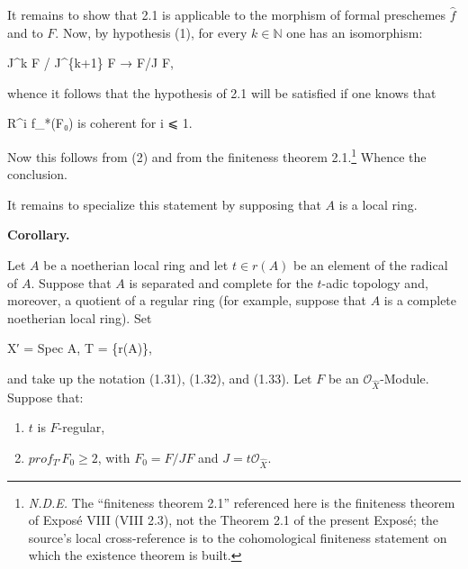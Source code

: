 \documentclass[
]{article}
\newenvironment{Shaded}{}{}
\newcommand{\NormalTok}[1]{#1}
\begin{document}
It remains to show that 2.1 is applicable to the morphism of formal
preschemes \(\hat{f}\) and to \(F\). Now, by hypothesis (1), for every
\(k \in \mathbb{N}\) one has an isomorphism:

\begin{Shaded}
\begin{Highlighting}[]
\NormalTok{J\^{}k F / J\^{}\{k+1\} F → F/J F,}
\end{Highlighting}
\end{Shaded}

whence it follows that the hypothesis of 2.1 will be satisfied if one
knows that

\begin{Shaded}
\begin{Highlighting}[]
\NormalTok{R\^{}i f\_*(F₀) is coherent for i ⩽ 1.}
\end{Highlighting}
\end{Shaded}

Now this follows from (2) and from the finiteness theorem
2.1.\footnote{\emph{N.D.E.} The ``finiteness theorem 2.1'' referenced
  here is the finiteness theorem of Exposé VIII (VIII 2.3), not the
  Theorem 2.1 of the present Exposé; the source's local cross-reference
  is to the cohomological finiteness statement on which the existence
  theorem is built.} Whence the conclusion.

It remains to specialize this statement by supposing that \(A\) is a
local ring.

\textbf{Corollary.}

Let \(A\) be a noetherian local ring and let \(t \in r(A)\) be an
element of the radical of \(A\). Suppose that \(A\) is separated and
complete for the \(t\)-adic topology and, moreover, a quotient of a
regular ring (for example, suppose that \(A\) is a complete noetherian
local ring). Set

\begin{Shaded}
\begin{Highlighting}[]
\NormalTok{X′ = Spec A,    T = \{r(A)\},}
\end{Highlighting}
\end{Shaded}

and take up the notation (1.31), (1.32), and (1.33). Let \(F\) be an
\(\mathcal{O}_{\hat{X}}\)-Module. Suppose that:

\begin{enumerate}
\def\labelenumi{(\arabic{enumi})}
\item
  \(t\) is \(F\)-regular,
\item
  \(prof_{T'} F_{0} \geqslant 2\), with \(F_{0} = F/J F\) and
  \(J = t\mathcal{O}_{\hat{X}}\).
\end{enumerate}
\end{document}
